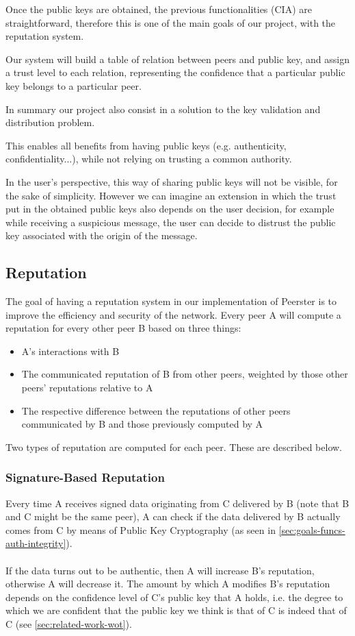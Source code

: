 \documentclass[]{article}
\begin{document}
Once the public keys are obtained, the previous functionalities (CIA) are straightforward, therefore this is one of the main goals of our project, with the reputation system.

Our system will build a table of relation between peers and public key, and assign a trust level to each relation, representing the confidence that a particular public key belongs to a particular peer.

In summary our project also consist in a solution to the key validation and distribution problem. 

This enables all benefits from having public keys (e.g. authenticity, confidentiality...), while not relying on trusting a common authority. \newline

In the user's perspective, this way of sharing public keys will not be visible, for the sake of simplicity. However we can imagine an extension in which the trust put in the obtained public keys also depends on the user decision, for example while receiving a suspicious message, the user can decide to distrust the public key associated with the origin of the message.

\subsection{Reputation}
The goal of having a reputation system in our implementation of Peerster is to improve the efficiency and security of the network.
Every peer A will compute a reputation for every other peer B based on three things:

\begin{itemize}
\item A's interactions with B
\item The communicated reputation of B from other peers, weighted by those other peers' reputations relative to A
\item The respective difference between the reputations of other peers communicated by B and those previously computed by A
\end{itemize}

Two types of reputation are computed for each peer. These are described below.

\subsubsection{Signature-Based Reputation}
\label{sec:sig-based-rep}
Every time A receives signed data originating from C delivered by B (note that B and C might be the same peer), A can check if the data delivered by B actually comes from C by means of Public Key Cryptography (as seen in \ref{sec:goals-funcs-auth-integrity}).
\\\\
If the data turns out to be authentic, then A will increase B's reputation, otherwise A will decrease it.
The amount by which A modifies B's reputation depends on the confidence level of C's public key that A holds, i.e. the degree to which we are confident that the public key we think is that of C is indeed that of C (see \ref{sec:related-work-wot}).
\end{document}
